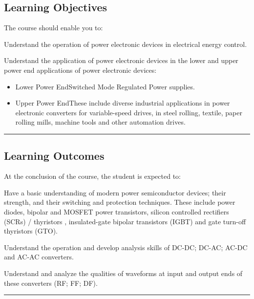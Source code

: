 \subsection*{Learning Objectives}
The course should enable you to:
\begin{outline}
    \1 Understand the operation of power electronic devices in electrical energy control.

    \1 Understand the application of power electronic devices in the lower and upper power end applications of power electronic devices:
    \begin{itemize}
        \item Lower Power End\newline Switched Mode Regulated Power supplies.
        \item Upper Power End\newline These include diverse industrial applications in power electronic converters for variable-speed drives, in steel rolling, textile, paper rolling mills, machine tools and other automation drives.
    \end{itemize}
\end{outline}
\vspace{2ex}\hrule\vspace{2ex}

\subsection*{Learning Outcomes}
At the conclusion of the course, the student is expected to:
\begin{outline}
    \1     Have a basic understanding of modern power semiconductor devices; their strength, and their switching and protection techniques.
    These include power diodes, bipolar and MOSFET power transistors, silicon controlled rectifiers (SCRs) / thyristors , insulated-gate bipolar transistors (IGBT) and gate turn-off thyristors (GTO).

    \1      Understand the operation and develop analysis skills of DC-DC; DC-AC; AC-DC and AC-AC converters.

    \1      Understand and analyze the qualities of waveforms at input and output ends of these converters (RF; FF; DF).

\end{outline}
\vspace{2ex}\hrule\vspace{2ex}


